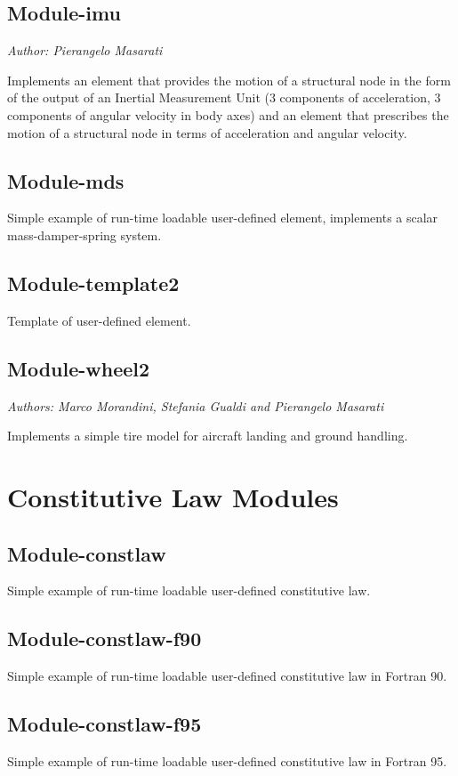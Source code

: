 \subsection{Module-imu}
\emph{Author: Pierangelo Masarati}

\noindent
Implements an element that provides the motion of a structural node
in the form of the output of an Inertial Measurement Unit
(3 components of acceleration, 3 components of angular velocity in body axes)
and an element that prescribes the motion of a structural node
in terms of acceleration and angular velocity.

\subsection{Module-mds}
Simple example of run-time loadable user-defined element,
implements a scalar mass-damper-spring system.

\subsection{Module-template2}
Template of user-defined element.

\subsection{Module-wheel2}
\emph{Authors: Marco Morandini, Stefania Gualdi and Pierangelo Masarati}

\noindent
Implements a simple tire model for aircraft landing and ground handling.



\section{Constitutive Law Modules}

\subsection{Module-constlaw}
Simple example of run-time loadable user-defined constitutive law.

\subsection{Module-constlaw-f90}
Simple example of run-time loadable user-defined constitutive law in Fortran 90.

\subsection{Module-constlaw-f95}
Simple example of run-time loadable user-defined constitutive law in Fortran 95.

